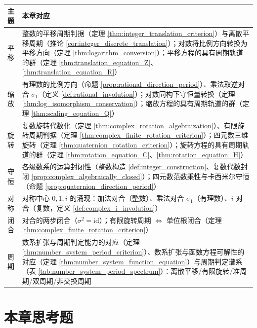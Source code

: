 \begin{center}
\renewcommand{\arraystretch}{1.3}
\begin{tabular}{>{\centering\arraybackslash}p{2.2cm}>{\centering\arraybackslash}p{10.5cm}}
\toprule
主题 & 本章对应 \\
\midrule
平移 & 整数的平移周期判据（定理 \ref{thm:integer_translation_criterion}）与离散平移周期（推论 \ref{cor:integer_discrete_translation}）；对数将比例方向转换为平移方向（定理 \ref{thm:logarithm_conversion}）；平移方程的具有周期轨道的群（定理 \ref{thm:translation_equation_Z}、\ref{thm:translation_equation_R}） \\
缩放 & 有理数的比例方向（命题 \ref{prop:rational_direction_period}）、乘法取逆对合 $\sigma_1$（定义 \ref{def:rational_involution}）；对数同构下守恒量转换（定理 \ref{thm:log_isomorphism_conservation}）；缩放方程的具有周期轨道的群（定理 \ref{thm:scaling_equation_Q}） \\
旋转 & 复数旋转代数化（定理 \ref{thm:complex_rotation_algebraization}）、有限旋转周期判据（定理 \ref{thm:complex_finite_rotation_criterion}）；四元数三维旋转（定理 \ref{thm:quaternion_rotation_criterion}）；旋转方程的具有周期轨道的群（定理 \ref{thm:rotation_equation_C}、\ref{thm:rotation_equation_H}） \\
守恒 & 各级数系的运算封闭性（整数构造 \ref{def:integer_construction}、复数代数封闭 \ref{prop:complex_algebraically_closed}）；四元数范数乘性与卡西米尔守恒（命题 \ref{prop:quaternion_direction_period}） \\
对称 & 对称中心 $0,1,i$ 的涌现：加法对合（整数）、乘法对合 $\sigma_1$（有理数）、$i$-对合（复数，定义 \ref{def:complex_i_involution}） \\
闭合 & 对合的两步闭合（$\sigma^2=\mathrm{id}$）；有限旋转周期 $\Leftrightarrow$ 单位根闭合（定理 \ref{thm:complex_finite_rotation_criterion}） \\
周期 & 数系扩张与周期判定能力的对应（定理 \ref{thm:number_system_period_criterion}）、数系扩张与函数方程可解性的对应（定理 \ref{thm:number_system_function_equation}）与周期判定谱系（表 \ref{tab:number_system_period_spectrum}）：离散平移/有限旋转/准周期/双周期/非交换周期 \\
\bottomrule
\end{tabular}
\end{center}

\section*{本章思考题}

